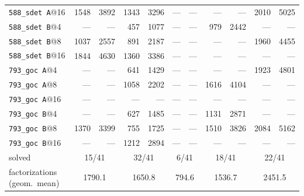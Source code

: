 \begin{table}[tbp]
\begin{tabular}{lrrrrrrrrrr}
\texttt{588\_sdet~A}@16 & 1548 & 3892 & 1343 & 3296 & --- & --- & --- & --- & 2010 & 5025 \\
\texttt{588\_sdet~B}@4 & --- & --- & 457 & 1077 & --- & --- & 979 & 2442 & --- & --- \\
\texttt{588\_sdet~B}@8 & 1037 & 2557 & 891 & 2187 & --- & --- & --- & --- & 1960 & 4455 \\
\texttt{588\_sdet~B}@16 & 1844 & 4630 & 1360 & 3386 & --- & --- & --- & --- & --- & --- \\
\texttt{793\_goc~A}@4 & --- & --- & 641 & 1429 & --- & --- & --- & --- & 1923 & 4801 \\
\texttt{793\_goc~A}@8 & --- & --- & 1058 & 2202 & --- & --- & 1616 & 4104 & --- & --- \\
\texttt{793\_goc~A}@16 & --- & --- & --- & --- & --- & --- & --- & --- & --- & --- \\
\texttt{793\_goc~B}@4 & --- & --- & 627 & 1485 & --- & --- & 1131 & 2871 & --- & --- \\
\texttt{793\_goc~B}@8 & 1370 & 3399 & 755 & 1725 & --- & --- & 1510 & 3826 & 2084 & 5162 \\
\texttt{793\_goc~B}@16 & --- & --- & 1212 & 2894 & --- & --- & --- & --- & --- & --- \\
\midrule solved & \multicolumn{2}{c}{15/41} & \multicolumn{2}{c}{32/41} & \multicolumn{2}{c}{6/41} & \multicolumn{2}{c}{18/41} & \multicolumn{2}{c}{22/41} \\
factorizations (geom.\ mean) & \multicolumn{2}{c}{1790.1} & \multicolumn{2}{c}{1650.8} & \multicolumn{2}{c}{794.6} & \multicolumn{2}{c}{1536.7} & \multicolumn{2}{c}{2451.5} \\
\bottomrule\end{tabular}\end{table}
